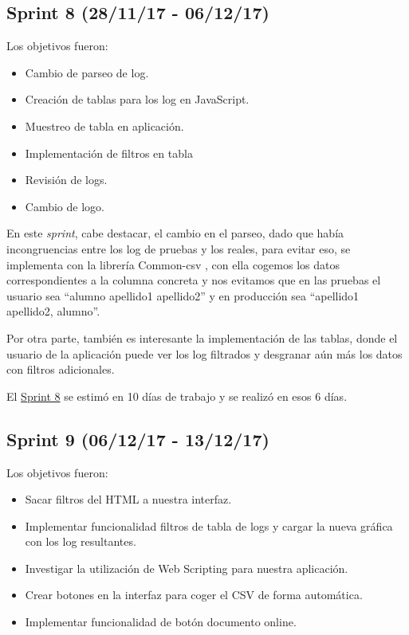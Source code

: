 \subsection{Sprint 8 (28/11/17 -
	06/12/17)}\label{sprint-8-281117---061217}

Los objetivos fueron:
\begin{itemize}
	\tightlist
	\item
	Cambio de parseo de log.
	\item
	Creación de tablas para los log en JavaScript.
	\item
	Muestreo de tabla en aplicación.
	\item
	Implementación de filtros en tabla
	\item
	Revisión de logs.
	\item
	Cambio de logo.
	
\end{itemize}

En este \emph{sprint}, cabe destacar, el cambio en el parseo, dado que había incongruencias entre los log de pruebas y los reales, para evitar eso, se implementa con la librería Common-csv \cite{Java:csv}, con ella cogemos los datos correspondientes a la columna concreta y nos evitamos que en las pruebas el usuario sea ``alumno apellido1 apellido2'' y en producción sea ``apellido1 apellido2, alumno''.

Por otra parte, también es interesante la implementación de las tablas, donde el usuario de la aplicación puede ver los log filtrados y desgranar aún más los datos con filtros adicionales.

El \href{https://github.com/trona85/GII-17.1B-UBULog-1.0/milestone/8?closed=1}{Sprint 8} se estimó en 10 días de trabajo y se realizó en esos 6 días.


\subsection{Sprint 9 (06/12/17 -
	13/12/17)}\label{sprint-9-061217---131217}

Los objetivos fueron:
\begin{itemize}
	\tightlist
	\item
	Sacar filtros del HTML a nuestra interfaz.
	\item
	Implementar funcionalidad filtros de tabla de logs y cargar la nueva gráfica con los log resultantes.
	\item
	Investigar la utilización de Web Scripting para nuestra aplicación.
	\item
	Crear botones en la interfaz para coger el CSV de forma automática.
	\item
	Implementar funcionalidad de botón documento online.
	
\end{itemize}

